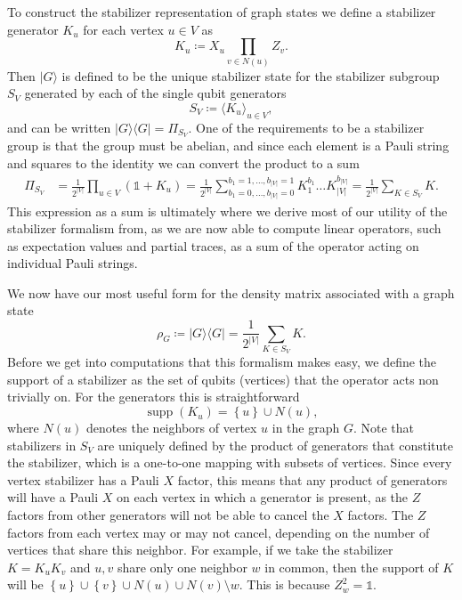 \documentclass{article}
\newcommand{\ket}[1]{|#1\rangle}
\newcommand{\ketbra}[2]{| #1\rangle\! \langle #2|}
\newcommand{\set}[1]{\left\{ #1 \right\}}
\newcommand{\identity}{\mathds{1}}
\DeclareMathOperator{\supp}{supp}
\begin{document}
 To construct the stabilizer representation of graph states we define a stabilizer generator $K_u$ for each vertex $u \in V$ as
\begin{equation}
    K_u \coloneqq X_u \prod_{v \in N(u)} Z_{v}.
\end{equation}
Then $\ket{G}$ is defined to be the unique stabilizer state for the stabilizer subgroup $S_V$ generated by each of the single qubit generators
\begin{equation}
    S_V \coloneqq \langle K_u \rangle_{u \in V},
\end{equation}
and can be written $\ketbra{G}{G} = \Pi_{S_V}$. One of the requirements to be a stabilizer group is that the group must be abelian, and since each element is a Pauli string and squares to the identity we can convert the product to a sum
\begin{align}
    \Pi_{S_V} &= \frac{1}{2^{|V|}} \prod_{u \in V} (\identity + K_u) = \frac{1}{2^{|V|}} \sum_{b_1 = 0, \ldots, b_{|V|} = 0}^{b_1 = 1, \ldots, b_{|V|} = 1} K_1^{b_1} \ldots K_{|V|}^{b_{|V|}} = \frac{1}{2^{|V|}} \sum_{K \in S_{V}} K.
\end{align}
This expression as a sum is ultimately where we derive most of our utility of the stabilizer formalism from, as we are now able to compute linear operators, such as expectation values and partial traces, as a sum of the operator acting on individual Pauli strings.

We now have our most useful form for the density matrix associated with a graph state
\begin{equation}
    \rho_G \coloneqq \ketbra{G}{G} = \frac{1}{2^{|V|}} \sum_{K \in S_V} K.
\end{equation}
Before we get into computations that this formalism makes easy, we define the support of a stabilizer as the set of qubits (vertices) that the operator acts non trivially on. For the generators this is straightforward
\begin{equation}
    \supp(K_u) = \set{u} \cup N(u),
\end{equation}
where $N(u)$ denotes the neighbors of vertex $u$ in the graph $G$. Note that stabilizers in $S_V$ are uniquely defined by the product of generators that constitute the stabilizer, which is a one-to-one mapping with subsets of vertices. Since every vertex stabilizer has a Pauli $X$ factor, this means that any product of generators will have a Pauli $X$ on each vertex in which a generator is present, as the $Z$ factors from other generators will not be able to cancel the $X$ factors. The $Z$ factors from each vertex may or may not cancel, depending on the number of vertices that share this neighbor. For example, if we take the stabilizer $K = K_u K_v$ and $u, v$ share only one neighbor $w$ in common, then the support of $K$ will be $\set{u} \cup \set{v} \cup N(u) \cup N(v) \setminus w$. This is because $Z_w^2 = \identity$. 
\end{document}
